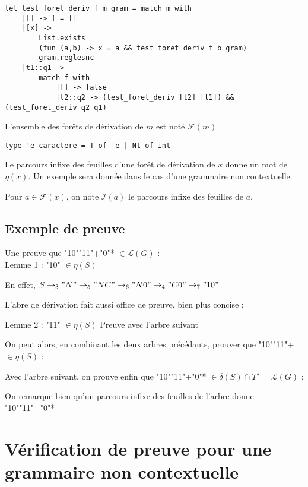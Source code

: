 \documentclass[a4paper,10pt
]{article}
\begin{document}
\begin{verbatim}
let test_foret_deriv f m gram = match m with
    |[] -> f = []
    |[x] -> 
        List.exists 
        (fun (a,b) -> x = a && test_foret_deriv f b gram) 
        gram.reglesnc
    |t1::q1 -> 
        match f with
            |[] -> false
            |t2::q2 -> (test_foret_deriv [t2] [t1]) && (test_foret_deriv q2 q1)
\end{verbatim}


L'ensemble des forêts de dérivation de $m$ est noté $\mathcal{F}(m)$.

\begin{verbatim}
type 'e caractere = T of 'e | Nt of int
\end{verbatim}

Le parcours infixe des feuilles d'une forêt de dérivation de $x$ donne un mot de $\eta(x)$.
Un exemple sera donnée dans le cas d'une grammaire non contextuelle.

Pour $a \in \mathcal{F}(x)$, on note $\mathcal{I}(a)$ le parcours infixe des feuilles de $a$. 

\subsection{Exemple de preuve}

Une preuve que "10""11"+"0"* $\in \mathcal{L}(G)$ :\\
Lemme 1 : "10" $\in \eta(S)$

    En effet, $S\rightarrow_3 "N" \rightarrow_5 "NC" \rightarrow_6 "N0" \rightarrow_4 "C0" \rightarrow_7 "10"$


L'abre de dérivation fait aussi office de preuve, bien plus concise :
   

Lemme 2 : "11" $\in \eta(S)$
Preuve avec l'arbre suivant
 

On peut alors, en combinant les deux arbres précédants, prouver que "10""11"+ $\in \eta(S)$ :
 

Avec l'arbre suivant, on prouve enfin que "10""11"+"0"* $\in \delta(S) \cap T^\star = \mathcal{L}(G)$ :
 

On remarque bien qu'un parcours infixe des feuilles de l'arbre donne "10""11"+"0"*

\section{Vérification de preuve pour une grammaire non contextuelle}
\end{document}
